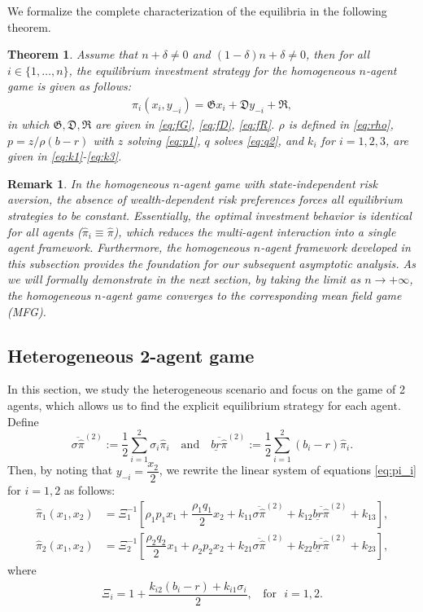 \documentclass[11pt]{article}
\newtheorem{theorem}{Theorem}[section]
\newtheorem{remark}{Remark}[section]
\numberwithin{equation}{section}
\providecommand{\smn}{{-}} %
\begin{document}
  We formalize the complete characterization of the equilibria in the following theorem.
 \begin{theorem}
 Assume that $n + \delta \neq 0$ and $(1 - \delta)n + \delta \neq 0$, then for all $i \in \{1, \ldots, n \}$,
the equilibrium investment strategy for the homogeneous \(n\)-agent game is given as follows:
\begin{align}
 	\widehat{\pi}_i(x_i,y_{\smn i}) = \mathfrak{G}x_i + \mathfrak{D}y_{-i} + \mathfrak{R},
 \end{align}
in which \(\mathfrak{G},  \mathfrak{D}, \mathfrak{R}\) are given in \eqref{eq:fG}, \eqref{eq:fD}, \eqref{eq:fR}. \(\rho\) is defined in \eqref{eq:rho}, \(p={z}/{\rho(b-r)}\) with \(z\) solving \eqref{eq:p1}, \(q\) solves \eqref{eq:q2}, and \(k_i\) for \(i=1,2,3\), are given in \eqref{eq:k1}-\eqref{eq:k3}.
\end{theorem}
 \begin{remark}
    In the homogeneous $n$-agent game with state-independent risk aversion, the absence of wealth-dependent risk preferences forces all equilibrium strategies to be constant. Essentially, the optimal investment behavior is identical for all agents ($\hat{\pi}_i \equiv \hat{\pi}$), which reduces the multi-agent interaction into a single agent framework. Furthermore, the homogeneous $n$-agent framework developed in this subsection  provides the foundation for our subsequent asymptotic analysis.  As we will formally demonstrate in the next section, by taking the limit as $n \to +\infty$, the homogeneous $n$-agent game converges to the corresponding mean field game (MFG).
 \end{remark}


    \subsection{Heterogeneous 2-agent game}\label{sec:heterogeneous case}
    In this section, we study the heterogeneous scenario and focus on the game of 2 agents, which allows us to find the explicit equilibrium strategy for each agent. Define
    \[\overline{\sigma\widehat{\pi}}^{(2)}:=\frac{1}{2}\sum_{i = 1}^2\sigma_i\widehat{\pi}_i \quad  \text{and} \quad \overline{\underline{br}\widehat{\pi}}^{(2)}:=\frac{1}{2}\sum_{i = 1}^2(b_i - r)\widehat{\pi}_i.
    \]
    Then, by noting that $y_{-i} = \dfrac{x_2}{2}$, we rewrite the linear system of equations \eqref{eq:pi_i} for $i=1,2$ as follows:
\begin{align}
		\widehat{\pi}_1( x_1,x_2) & =\Xi_1^{-1}\left[\rho_1 p_1x_1+ \dfrac{\rho_1 q_1}{2}x_2+k_{11}\overline{\sigma\widehat{\pi}}^{(2)}+k_{12}\overline{\underline{br}\widehat{\pi}}^{(2)}+k_{13}\right], \label{eq:hpi1}\\
		\widehat{\pi}_2( x_1,x_2) & =\Xi_2^{-1}\left[\dfrac{\rho_2 q_2 }{2}x_1 + \rho_2 p_2x_2 +k_{21}\overline{\sigma\widehat{\pi}}^{(2)}+k_{22}\overline{\underline{br}\widehat{\pi}}^{(2)}+k_{23}\right], \label{eq:hpi2}
\end{align}
where  \begin{align}\label{eq:Ni}
\Xi_i=1 + \dfrac{k_{i2}(b_i-r)+k_{i1}\sigma_i}{2},   ~~~~\mbox{for} ~~~i=1,2.
\end{align}
\end{document}
